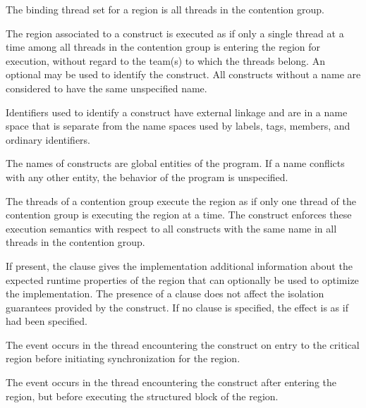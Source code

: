 \binding
The binding thread set for a  region is all threads in the contention group.

\descr
The region associated to a  construct is executed as if only a single thread at a time among all threads in the
contention group is entering the region for execution, without regard to the team(s) to which the threads belong.
An optional  may be used to identify the  construct. All 
constructs without a name are considered to have the same unspecified name.

\begin{ccppspecific}
Identifiers used to identify a  construct have external linkage and are in a
name space that is separate from the name spaces used by labels, tags, members, and
ordinary identifiers.
\end{ccppspecific}

\begin{fortranspecific}
The names of  constructs are global entities of the program. If a name
conflicts with any other entity, the behavior of the program is unspecified.
\end{fortranspecific}

The threads of a contention group execute the  region as if only one thread of the contention group is executing the  region at a time.
The  construct enforces these execution semantics with respect to all  constructs with the same name in all
threads in the contention group.

If present, the  clause gives the implementation additional
information about the expected runtime properties of the  region
that can optionally be used to optimize the implementation.
The presence of a  clause does not affect the isolation
guarantees provided by the  construct. If no
 clause is specified, the effect is as if 
had been specified.

\events
The  event occurs in the thread encountering the
 construct on entry to the critical region before
initiating synchronization for the region.

The  event occurs in the thread encountering the
 construct after entering the region, but before executing the
structured block of the  region.

